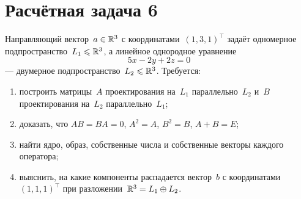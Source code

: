 \section{Расчётная задача 6}

Направляющий вектор~$a \in \mathbb{R}^3$ с координатами~$(1, 3, 1)^\top$ задаёт одномерное подпространство~$L_1 \leqslant \mathbb{R}^3$, а линейное однородное уравнение
\[
	5x - 2y + 2z = 0
\]
--- двумерное подпространство~$L_2 \leqslant \mathbb{R}^3$. Требуется:
\begin{enumerate}[1)]
	\item построить матрицы~$A$ проектирования на~$L_1$ параллельно~$L_2$ и~$B$ проектирования на~$L_2$ параллельно~$L_1$;
	\item доказать, что $AB = BA = 0$, $A^2 = A$, $B^2 = B$, $A + B = E$;
	\item найти ядро, образ, собственные числа и собственные векторы каждого оператора;
	\item выяснить, на какие компоненты распадается вектор~$b$ с координатами $(1, 1, 1)^\top$ при разложении~$\mathbb{R}^3 = L_1 \oplus L_2$.
\end{enumerate}
